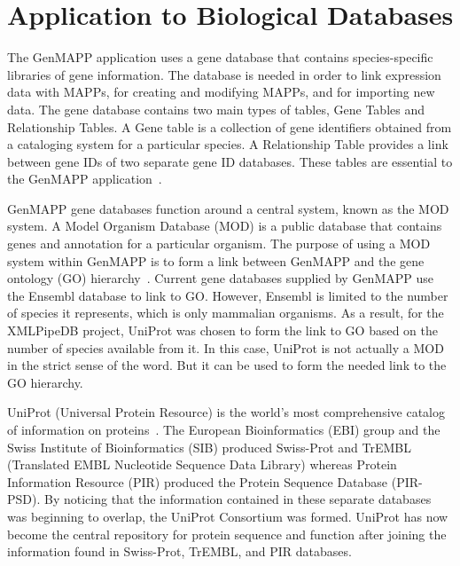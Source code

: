 \section{Application to Biological Databases}
\label{biodb}
The GenMAPP application uses a gene database that contains species-specific 
libraries of gene information.  The database is needed in order to link expression
data with MAPPs, for creating and modifying MAPPs, and for importing new data.  
The gene database contains two main types of tables, Gene Tables and Relationship 
Tables.  A Gene table is a collection of gene identifiers obtained from a 
cataloging system for a particular species.  A Relationship Table provides a link 
between gene IDs of two separate gene ID databases.  These tables are essential to
the GenMAPP application~\cite{noSupport}.  

GenMAPP gene databases function around a central system, known as the MOD system.  
A Model Organism Database (MOD) is a public database that contains genes and 
annotation for a particular organism.  
The purpose of using a MOD system within GenMAPP is to form a link between
GenMAPP and the gene ontology (GO) hierarchy~\cite{noSupport}.  Current gene 
databases supplied by GenMAPP use the Ensembl database to link to GO.  However, 
Ensembl is limited to the number of species it represents, which is only 
mammalian organisms.  
As a result, for the XMLPipeDB project, UniProt was chosen to form the link to GO
based on the number of species available from it.  In this case, UniProt is not 
actually a MOD in the strict sense of the word.  But it can be used to form the 
needed link to the GO hierarchy.  

UniProt (Universal Protein Resource) is the world's most comprehensive catalog of 
information on proteins~\cite{uniprotWeb}.  
The European Bioinformatics (EBI) group and the
Swiss Institute of Bioinformatics (SIB) produced Swiss-Prot and TrEMBL 
(Translated EMBL Nucleotide Sequence Data Library)
whereas 
Protein Information Resource (PIR) produced the Protein Sequence Database (PIR-PSD).  
By noticing that the information contained in these separate databases was beginning
to overlap, the UniProt Consortium was formed.  
UniProt has now become the central repository 
for protein sequence and function after joining the information found in 
Swiss-Prot, TrEMBL, and PIR databases.  


